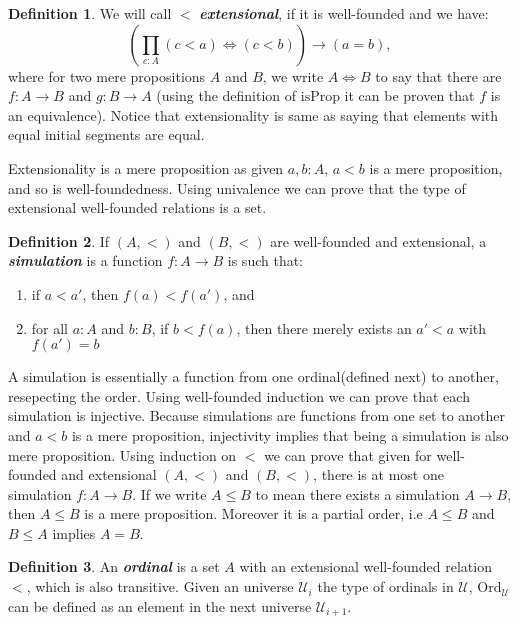 \documentclass[10pt]{article}
\theoremstyle{definition}
\newtheorem{definition}{Definition}[section]
\theoremstyle{plain}
\theoremstyle{remark}
\newcommand{\U}{\mathscr{U}}
\begin{document}
\begin{definition}\label{D:Ext}
We will call $<$ \textbf{\textit{extensional}}, if it is well-founded and we have:
\[ \left( \prod_{c : A}  (c<a) \iff (c<b) \right) \to (a = b),\]
where for two mere propositions $A$ and $B$, we write $A\iff B$ to say that there are 
$f : A \to B$ and $g : B \to A$ (using the definition of $\text{isProp}$ it can be proven 
that $f$ is an equivalence). Notice that extensionality is same as saying that elements 
with equal initial segments are equal.
\end{definition} 

Extensionality is a mere proposition as given $a,b:A$, $a<b$ is a mere proposition, and so
is well-foundedness. Using univalence we can prove that the type of extensional well-founded
relations is a set.

\begin{definition}\label{D:sim}
If $(A,<)$ and $(B,<)$ are well-founded and extensional, a \textbf{\textit{simulation}} is
a function $f : A \to B$ is such that:
\begin{enumerate}
\item if $a < a'$, then $f(a) < f(a')$, and
\item for all $a : A$ and $b : B$, if $b < f(a)$, then there merely exists an $a' < a$ with
      $f(a') = b$
\end{enumerate}
\end{definition} 

A simulation is essentially a function from one ordinal(defined next) to another, 
resepecting the order. Using well-founded induction we can prove that each simulation is 
injective. Because simulations are functions from one set to another and $a<b$ is a mere 
proposition, injectivity implies that being a simulation is also mere proposition. Using 
induction on $<$ we can prove that given for well-founded and extensional $(A,<)$ and $(B,<)$, 
there is at most one simulation $f:A \to B$. If we write $A \leq B$ to mean there exists a 
simulation $A \to B$, then $A \leq B$ is a mere proposition. Moreover it is a partial order, 
i.e $A \leq B$ and $B \leq A$ implies $A = B$. 

\begin{definition}\label{D:Ordinal}
An \textbf{\textit{ordinal}} is a set $A$ with an extensional well-founded relation $<$, which
is also transitive. Given an universe $\U_i$ the type of ordinals in $\U$, $\text{Ord}_{\U}$
can be defined as an element in the next universe $\U_{i+1}$.
\end{definition}
\end{document}
